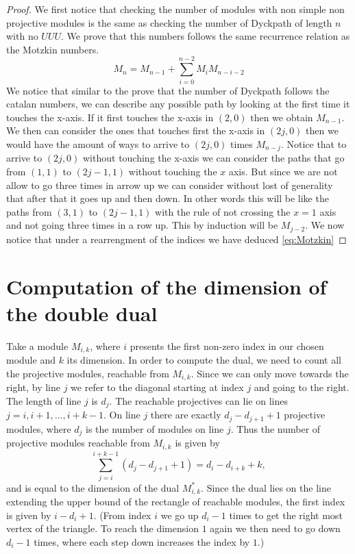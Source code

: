 \documentclass[12pt, a4paper]{article}
\numberwithin{equation}{section}
\theoremstyle{definition}
\theoremstyle{plain}
\theoremstyle{remark}
\begin{document}
\begin{proof}
	We first notice that checking the number of modules with non simple non projective modules is the same as checking the number of Dyckpath of length $n$ with no $UUU$.
	We prove that this numbers follows the same recurrence relation as the Motzkin numbers.
\begin{equation}
	\label{eq:Motzkin} 
	M_n=M_{n-1}+\sum_{i=0}^{n-2}M_iM_{n-i-2}
\end{equation}
We notice that similar to the prove that the number of Dyckpath follows the catalan numbers,
we can describe any possible path by looking at the first time it touches the x-axis.
If it first touches the x-axis in $(2,0)$ then we obtain $M_{n-1}$. We then can consider the ones that touches first
the x-axis in $(2j,0)$ then we would have the amount of ways to arrive to $(2j,0)$ times $M_{n-j}$. 
Notice that to arrive to $(2j,0)$ without touching the x-axis we can consider the paths that go from 
$(1,1)$ to $(2j-1,1)$ without touching the $x$ axis. But since we are not allow to go three times
in arrow up we can consider without lost of generality that after that it goes up and then down.
In other words this will be like the paths from $(3,1)$ to $(2j-1,1)$ with the rule of not crossing the $x=1$ axis and not going three times in a row up.
This by induction will be $M_{j-2}$. We now notice that under a rearrengment of the indices we have deduced \ref{eq:Motzkin}
\end{proof}
\section{Computation of the dimension of the double dual}
Take a module $M_{i,k}$, where $i$ presents the first non-zero index in our chosen module and $k$ its dimension. 
In order to compute the dual, we need to count all the projective modules, reachable from $M_{i,k}$. 
Since we can only move towards the right, by line $j$ we refer to the diagonal starting at index $j$ and going to the right. The length of line $j$ is $d_j$.
The reachable projectives can lie on lines $j = i, i+1, \dots, i+k-1$.
On line $j$ there are exactly $d_j - d_{j+1} + 1$ projective modules, where $d_j$ is the number of modules on line $j$.
Thus the number of projective modules reachable from $M_{i,k}$ is given by
\begin{equation}
\label{eq:reachable}
\sum_{j=i}^{i+k-1} (d_j - d_{j+1} + 1) = d_i - d_{i+k} + k,
\end{equation}
and is equal to the dimension of the dual $M^*_{i,k}$.
Since the dual lies on the line extending the upper bound of the rectangle of reachable modules, the first index is given by $i - d_i + 1$.
(From index $i$ we go up $d_i - 1$ times to get the right most vertex of the triangle. To reach the dimension $1$ again we then need to go down $d_i - 1$ times, where each step down increases the index by $1$.)
\end{document}
